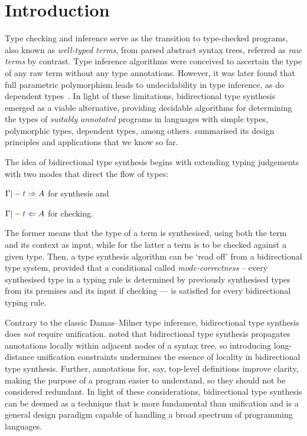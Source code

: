 
\section{Introduction}\label{sec:intro}

Type checking and inference serve as the transition to type-checked programs, also known as \emph{well-typed terms}, from parsed abstract syntax trees, referred as \emph{raw terms} by contrast.
Type inference algorithms were conceived to ascertain the type of any raw term without any type annotations.
However, it was later found that full parametric polymorphism leads to undecidability in type inference, as do dependent types~\citep{Wells1999,Dowek1993}.
In light of these limitations, bidirectional type synthesis emerged as a viable alternative, providing decidable algorithms for determining the types of \emph{suitably annotated} programs in languages with simple types, polymorphic types, dependent types, among others. 
\citet{Dunfield2021} summarised its design principles and applications that we know so far. 

The idea of bidirectional type synthesis begins with extending typing judgements with two modes that direct the flow of types:
\begin{enumerate*}
  \item $\Gamma |- \isTerm{t} \syn A$ for synthesis and 
  \item $\Gamma |- \isTerm{t} \chk A$ for checking.
\end{enumerate*}
The former means that the type of a term is synthesised, using both the term and its context as input, while for the latter a term is to be checked against a given type.
Then, a type synthesis algorithm can be `read off' from a bidirectional type system, provided that a conditional called \emph{mode-correctness} -- every synthesised type in a typing rule is determined by previously synthesised types from its premises and its input if checking --- is satisfied for every bidirectional typing rule.


Contrary to the classic Damas--Milner type inference, bidirectional type synthesis does \emph{not} require unification.
\citet{Pierce2000} noted that bidirectional type synthesis propagates annotations locally within adjacent nodes of a syntax tree, so introducing long-distance unification constraints undermines the essence of locality in bidirectional type synthesis.
Further, annotations for, say, top-level definitions improve clarity, making the purpose of a program easier to understand, so they should not be considered redundant.
In light of these considerations, bidirectional type synthesis can be deemed as a technique that is more fundamental than unification and is a general design paradigm capable of handling a broad spectrum of programming languages.

